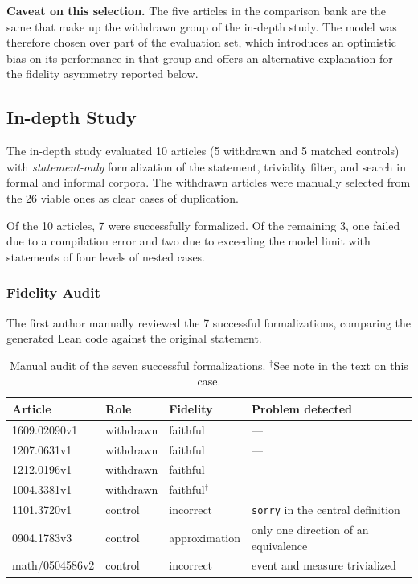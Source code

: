\textbf{Caveat on this selection.} The five articles in the comparison bank are the same that make up the withdrawn group of the in-depth study. The model was therefore chosen over part of the evaluation set, which introduces an optimistic bias on its performance in that group and offers an alternative explanation for the fidelity asymmetry reported below.

\subsection{In-depth Study}

The in-depth study evaluated 10 articles (5 withdrawn and 5 matched controls) with \textit{statement-only} formalization of the statement, triviality filter, and search in formal and informal corpora. The withdrawn articles were manually selected from the 26 viable ones as clear cases of duplication.

Of the 10 articles, 7 were successfully formalized. Of the remaining 3, one failed due to a compilation error and two due to exceeding the model limit with statements of four levels of nested cases.

\subsubsection{Fidelity Audit}

The first author manually reviewed the 7 successful formalizations, comparing the generated Lean code against the original statement.

\begin{table}[htbp]
\centering
\small
\begin{tabular}{llll}
\toprule
Article & Role & Fidelity & Problem detected \\
\midrule
1609.02090v1   & withdrawn & faithful & --- \\
1207.0631v1    & withdrawn & faithful & --- \\
1212.0196v1    & withdrawn & faithful & --- \\
1004.3381v1    & withdrawn & faithful$^{\dagger}$ & --- \\
1101.3720v1    & control  & incorrect & \texttt{sorry} in the central definition \\
0904.1783v3    & control  & approximation & only one direction of an equivalence \\
math/0504586v2 & control  & incorrect & event and measure trivialized \\
\bottomrule
\end{tabular}
\caption{Manual audit of the seven successful formalizations. $^{\dagger}$See note in the text on this case.}
\label{tab:fidelidad}
\end{table}

